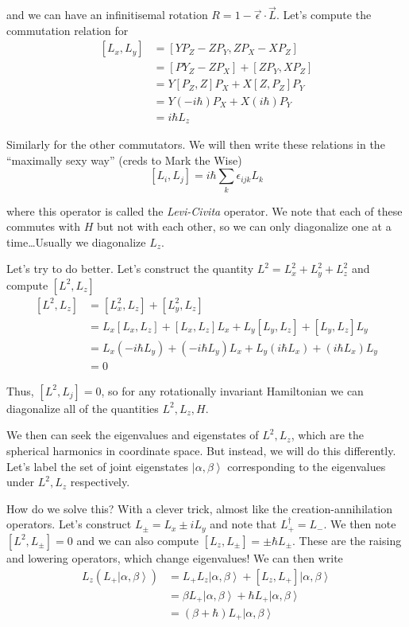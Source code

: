 \documentclass[10pt]{report}
\newcommand{\ket}[1]{\left|#1\right>}
\begin{document}
and we can have an infinitisemal rotation $R = 1 - \vec{\epsilon}\cdot \vec{L}$. Let's compute the commutation relation for 
\begin{align}
	\left[ L_x, L_y \right] &= \left[ YP_Z - ZP_Y, ZP_X - XP_Z \right]\\
	&= \left[ PY_Z - ZP_X \right] + \left[ ZP_Y, XP_Z \right]\\
	&= Y\left[ P_Z,Z \right]P_X + X\left[ Z,P_Z \right]P_Y\\
	&= Y\left( -i\hbar \right)P_X + X\left( i\hbar \right)P_Y\\
	&= i\hbar L_z
\end{align}

Similarly for the other commutators. We will then write these relations in the ``maximally sexy way'' (creds to Mark the Wise)
$$\left[ L_i, L_j \right] = i\hbar \sum_k \epsilon_{ijk}L_k$$

where this operator is called the \emph{Levi-Civita} operator. We note that each of these commutes with $H$ but not with each other, so we can only diagonalize one at a time\dots Usually we diagonalize $L_z$.

Let's try to do better. Let's construct the quantity $L^2 = L_x^2 + L_y^2 + L_z^2$ and compute $\left[ L^2, L_z \right]$
\begin{align}
	\left[ L^2 , L_z\right] &= \left[ L_x^2,L_z \right] + \left[ L_y^2, L_z \right]\\
	&= L_x\left[ L_x, L_z \right] + \left[ L_x, L_z \right]L_x + L_y\left[ L_y, L_z \right] + \left[ L_y, L_z \right]L_y\\
	&= L_x\left( -i\hbar L_y \right) + \left( -i\hbar L_y \right)L_x + L_y\left( i\hbar L_x \right) + \left( i\hbar L_x \right)L_y\\
	&= 0
\end{align}

Thus, $\left[ L^2, L_j \right] = 0$, so for any rotationally invariant Hamiltonian we can diagonalize all of the quantities $L^2, L_z, H$. 

We then can seek the eigenvalues and eigenstates of $L^2, L_z$, which are the spherical harmonics in coordinate space. But instead, we will do this differently. Let's label the set of joint eigenstates $\ket{\alpha,\beta}$ corresponding to the eigenvalues under $L^2, L_z$ respectively. 

How do we solve this? With a clever trick, almost like the creation-annihilation operators. Let's construct $L_{\pm} = L_x \pm iL_y$ and note that $L_+^\dagger = L_-$. We then note $\left[ L^2, L_\pm \right] = 0$ and we can also compute $\left[ L_z, L_\pm \right] = \pm \hbar L_\pm$. These are the raising and lowering operators, which change eigenvalues! We can then write
\begin{align}
	L_z(L_+\ket{\alpha,\beta}) &= L_+L_z\ket{\alpha,\beta} + \left[ L_z, L_+ \right]\ket{\alpha,\beta}\\
	&= \beta L_+\ket{\alpha,\beta} + \hbar L_+\ket{\alpha,\beta}\\
	&= (\beta+\hbar)L_+ \ket{\alpha,\beta}
\end{align}
\end{document}
